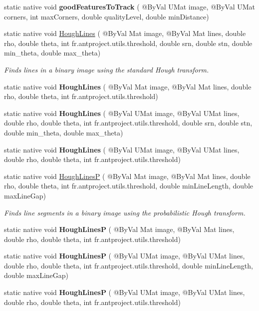 \begin{DoxyCompactItemize}
\item 
static native void {\bfseries good\+Features\+To\+Track} ( @By\+Val U\+Mat image, @By\+Val U\+Mat corners, int max\+Corners, double quality\+Level, double min\+Distance)
\item 
static native void \hyperlink{group__imgproc__feature_ga304555e089d6883caf9ac96ebef50718}{Hough\+Lines} ( @By\+Val Mat image, @By\+Val Mat lines, double rho, double theta, int fr.antproject.utils.threshold, double srn, double stn, double min\+\_\+theta, double max\+\_\+theta)
\begin{DoxyCompactList}\small\item\em Finds lines in a binary image using the standard Hough transform. \end{DoxyCompactList}\item 
static native void {\bfseries Hough\+Lines} ( @By\+Val Mat image, @By\+Val Mat lines, double rho, double theta, int fr.antproject.utils.threshold)
\item 
static native void {\bfseries Hough\+Lines} ( @By\+Val U\+Mat image, @By\+Val U\+Mat lines, double rho, double theta, int fr.antproject.utils.threshold, double srn, double stn, double min\+\_\+theta, double max\+\_\+theta)
\item 
static native void {\bfseries Hough\+Lines} ( @By\+Val U\+Mat image, @By\+Val U\+Mat lines, double rho, double theta, int fr.antproject.utils.threshold)
\item 
static native void \hyperlink{group__imgproc__feature_gaac39ae22179f4396e7034f6d2a4cce1e}{Hough\+LinesP} ( @By\+Val Mat image, @By\+Val Mat lines, double rho, double theta, int fr.antproject.utils.threshold, double min\+Line\+Length, double max\+Line\+Gap)
\begin{DoxyCompactList}\small\item\em Finds line segments in a binary image using the probabilistic Hough transform. \end{DoxyCompactList}\item 
static native void {\bfseries Hough\+LinesP} ( @By\+Val Mat image, @By\+Val Mat lines, double rho, double theta, int fr.antproject.utils.threshold)
\item 
static native void {\bfseries Hough\+LinesP} ( @By\+Val U\+Mat image, @By\+Val U\+Mat lines, double rho, double theta, int fr.antproject.utils.threshold, double min\+Line\+Length, double max\+Line\+Gap)
\item 
static native void {\bfseries Hough\+LinesP} ( @By\+Val U\+Mat image, @By\+Val U\+Mat lines, double rho, double theta, int fr.antproject.utils.threshold)

\end{DoxyCompactItemize}
